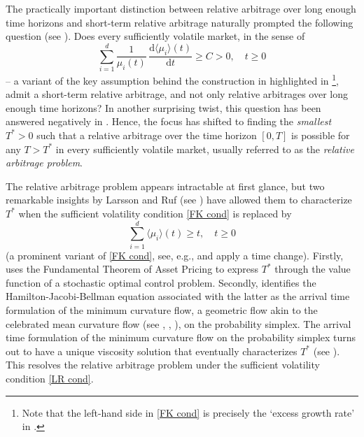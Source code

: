 \documentclass[11pt]{amsart}
\numberwithin{equation}{section}
\begin{document}
The practically important distinction between relative arbitrage over long enough time horizons and short-term relative arbitrage naturally prompted the following question (see \cite[Section 4]{BF08}). Does every sufficiently volatile market, in the sense of 
\begin{equation}\label{FK cond}
\sum_{i=1}^d  \frac{1}{\mu_i(t)}\,\frac{\mathrm{d}{\langle\mu_i\rangle}(t)}{\mathrm{d}t}  \ge C>0,\quad t\geq 0
\end{equation}
-- a variant of the key assumption behind the construction in \cite[Example 3.3.3]{fernholz_stochastic_2002} highlighted in \cite[Section 3]{fernholz_relative_2005}\footnote{Note that the left-hand side in \eqref{FK cond} is precisely the `excess growth rate' in \cite[display (3.1)]{fernholz_relative_2005}.}, admit a short-term relative arbitrage, and not only relative arbitrages over long enough time horizons? In another surprising twist, this question has been answered negatively in  \cite[Section 6]{fernholz_volatility_2018}. Hence, the focus has shifted to finding the \textit{smallest} $T^*>0$ such that a relative arbitrage over the time horizon $[0,T]$ is possible for any $T>T^*$ in every sufficiently volatile market, usually referred to as the \textit{relative arbitrage problem}.      

\medskip

The relative arbitrage problem appears intractable at first glance, but two remarkable insights by Larsson and Ruf (see \cite{larsson_relative_2021}) have allowed them to characterize $T^*$ when the sufficient volatility condition \eqref{FK cond} is replaced by 
\begin{equation}\label{LR cond}
\sum_{i=1}^d \langle\mu_i\rangle(t)\ge t,\quad t\geq 0
\end{equation}
(a prominent variant of \eqref{FK cond}, see, e.g., \cite[Example 5.5]{KR17} and apply a time change). Firstly, \cite{larsson_relative_2021} uses the Fundamental Theorem of Asset Pricing to express $T^*$ through the value function of a stochastic optimal control problem. Secondly, \cite{larsson_relative_2021} identifies the Hamilton-Jacobi-Bellman equation associated with the latter as the arrival time formulation of the minimum curvature flow, a geometric flow akin to the celebrated mean curvature flow (see \cite{Mullins56}, \cite{Brakke78}, \cite{Huisken84}), on the probability simplex. The arrival time formulation of the minimum curvature flow on the probability simplex turns out to have a unique viscosity solution that eventually characterizes $T^*$ (see \cite[Theorem~5.1]{larsson_relative_2021}). This resolves the relative arbitrage problem under the sufficient volatility condition \eqref{LR cond}.
\end{document}
